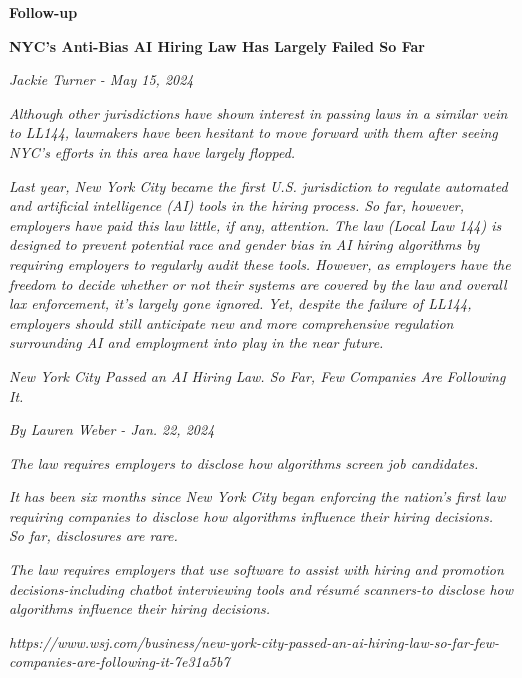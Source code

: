 \documentclass{article}%
\begin{document}
\textbf{Follow-up}

\textbf{NYC's Anti-Bias AI Hiring Law Has Largely Failed So Far}

\textit{Jackie Turner - May 15, 2024}

\textit{Although other jurisdictions have shown interest in passing laws in a similar vein to LL144, lawmakers have been hesitant to move forward with them after seeing NYC's efforts in this area have largely flopped.}

\textit{Last year, New York City became the first U.S. jurisdiction to regulate automated and artificial intelligence (AI) tools in the hiring process. So far, however, employers have paid this law little, if any, attention. The law (Local Law 144) is designed to prevent potential race and gender bias in AI hiring algorithms by requiring employers to regularly audit these tools. However, as employers have the freedom to decide whether or not their systems are covered by the law and overall lax enforcement, it's largely gone ignored. Yet, despite the failure of LL144, employers should still anticipate new and more comprehensive regulation surrounding AI and employment into play in the near future.}

\textit{New York City Passed an AI Hiring Law. So Far, Few Companies Are Following It.}

\textit{By Lauren Weber - Jan. 22, 2024}

\textit{The law requires employers to disclose how algorithms screen job candidates.}

\textit{It has been six months since New York City began enforcing the nation's first law requiring companies to disclose how algorithms influence their hiring decisions. So far, disclosures are rare.}

\textit{The law requires employers that use software to assist with hiring and promotion decisions-including chatbot interviewing tools and résumé scanners-to disclose how algorithms influence their hiring decisions.}

\textit{https://www.wsj.com/business/new-york-city-passed-an-ai-hiring-law-so-far-few-companies-are-following-it-7e31a5b7}
%
\end{document}

